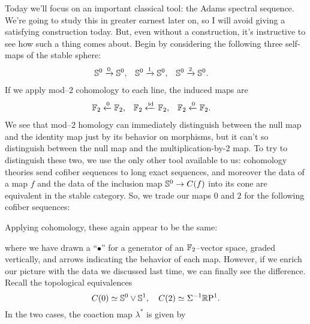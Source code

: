  Today we'll focus on an important classical tool: the Adams spectral sequence.  We're going to study this in greater earnest later on, so I will avoid giving a satisfying construction today.  But, even without a construction, it's instructive to see how such a thing comes about.    Begin by considering the following three self-maps of the stable sphere:
\begin{align*}
\S^0 & \xrightarrow{0} \S^0, & \S^0 & \xrightarrow{1} \S^0, & \S^0 & \xrightarrow{2} \S^0.
\end{align*}
If we apply mod--$2$ cohomology to each line, the induced maps are
\begin{align*}
\F_2 & \xleftarrow{0} \F_2, & \F_2 & \xleftarrow{\id} \F_2, & \F_2 & \xleftarrow{0} \F_2.
\end{align*}
We see that mod--$2$ homology can immediately distinguish between the null map and the identity map just by its behavior on morphisms, but it can't so distinguish between the null map and the multiplication-by-$2$ map.  To try to distinguish these two, we use the only other tool available to us: cohomology theories send cofiber sequences to long exact sequences, and moreover the data of a map $f$ and the data of the inclusion map $\S^0 \to C(f)$ into its cone are equivalent in the stable category.  So, we trade our maps $0$ and $2$ for the following cofiber sequences:
\begin{center}
\end{center}
Applying cohomology, these again appear to be the same:
\begin{center}
\end{center}
where we have drawn a ``$\bullet$'' for a generator of an $\F_2$--vector space, graded vertically, and arrows indicating the behavior of each map.  However, if we enrich our picture with the data we discussed last time, we can finally see the difference.  Recall the topological equivalences \[C(0) \simeq \S^0 \vee \S^1, \quad C(2) \simeq \Susp^{-1} \RP^1.\]  In the two cases, the coaction map $\lambda^*$ is given by
